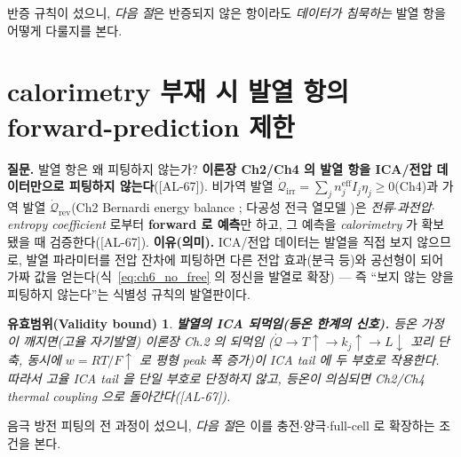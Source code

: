 \documentclass[11pt,a4paper]{article}
\newtheorem*{boundbox}{유효범위(Validity bound)}
\newcommand{\eff}{\mathrm{eff}}
\newcommand{\irr}{\mathrm{irr}}
\newcommand{\rev}{\mathrm{rev}}
\newcommand{\AL}[1]{\textsf{[AL-#1]}}
\begin{document}
반증 규칙이 섰으니, \emph{다음 절}은 반증되지 않은 항이라도 \emph{데이터가 침묵하는} 발열 항을 어떻게 다룰지를 본다.

\section{calorimetry 부재 시 발열 항의 forward-prediction 제한}\label{sec:ch6_heat}
\textbf{질문.} 발열 항은 왜 피팅하지 않는가? \textbf{이론장 Ch2/Ch4 의 발열 항을 ICA/전압 데이터만으로 피팅하지
않는다}(\AL{67}). 비가역 발열 $\dot{\mathcal Q}_\irr=\sum_j n_j^{\eff}I_j\eta_j\ge0$(Ch4)과 가역 발열
$\dot{\mathcal Q}_\rev$(Ch2 Bernardi energy balance \cite{bernardi1985}; 다공성 전극 열모델
\cite{thomasnewman2003})은 \emph{전류$\cdot$과전압$\cdot$entropy coefficient} 로부터 \textbf{forward 로 예측}만
하고, 그 예측을 \emph{calorimetry} 가 확보됐을 때 검증한다(\AL{67}).
\textbf{이유(의미).} ICA/전압 데이터는 발열을 직접 보지 않으므로, 발열 파라미터를 전압 잔차에 피팅하면 다른 전압
효과(분극 등)와 공선형이 되어 가짜 값을 얻는다(식~\eqref{eq:ch6_no_free} 의 정신을 발열로 확장) — 즉 ``보지 않는
양을 피팅하지 않는다''는 식별성 규칙의 발열판이다.
\begin{boundbox}
\textbf{발열의 ICA 되먹임(등온 한계의 신호).} 등온 가정이 깨지면(고율 자기발열) 이론장 Ch.2 의 되먹임
($\dot{\mathcal Q}\to T\uparrow\to k_j\uparrow\to L\downarrow$ 꼬리 단축, 동시에 $w=RT/F\uparrow$ 로 평형 peak
폭 증가)이 ICA tail 에 두 부호로 작용한다. 따라서 고율 ICA tail 을 단일 부호로 단정하지 않고, 등온이 의심되면
Ch2/Ch4 thermal coupling 으로 돌아간다(\AL{67}).
\end{boundbox}

음극 방전 피팅의 전 과정이 섰으니, \emph{다음 절}은 이를 충전$\cdot$양극$\cdot$full-cell 로 확장하는 조건을 본다.

\end{document}
